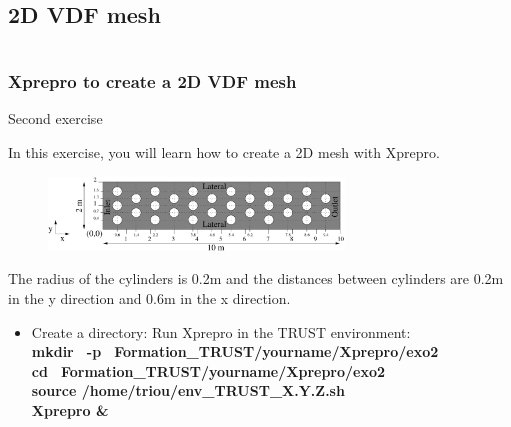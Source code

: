 \documentclass[10pt, hyperref={unicode=true,pdfusetitle, bookmarks=true,bookmarksnumbered=false,bookmarksopen=false, breaklinks=false,pdfborder={0 0 1},backref=true,colorlinks=true,linkcolor=darkblue,pageanchor}]{beamer}
\begin{document}
\subsection{2D VDF mesh}
\begin{frame}
\begin{small}
\begin{columns}[c] 
\tableofcontents[sections={1-9},currentsection, currentsubsection]
\tableofcontents[sections={10-16},currentsection, currentsubsection]
\end{columns}
\end{small}
\end{frame}
\begin{frame}
\frametitle{Xprepro to create a 2D VDF mesh}
\begin{block}{Second exercise}

In this exercise, you will learn how to create a 2D mesh with Xprepro. 

\begin{figure}
\includegraphics[width=0.7\textwidth]{PICTURES/xprepro.pdf}
\end{figure}

The radius of the cylinders is 0.2m and the distances between cylinders are 0.2m in the y direction and 0.6m in the x direction. \\

\begin{itemize}
\item Create a directory: Run Xprepro in the TRUST environment:\\
\textbf{mkdir \, -p \, Formation\_TRUST/yourname/Xprepro/exo2} \\
\textbf{cd \, Formation\_TRUST/yourname/Xprepro/exo2} \\
\textbf{source /home/triou/env\_TRUST\_X.Y.Z.sh }\\
\textbf{Xprepro \&} 
\end{itemize}

\end{block}
\end{frame}
\end{document}
